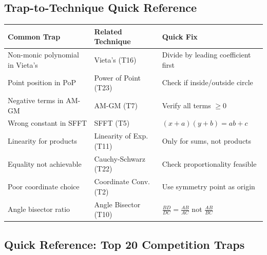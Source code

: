 \documentclass{article}
\begin{document}
\subsection{Trap-to-Technique Quick Reference}

\begin{center}
\begin{tabular}{|p{4cm}|p{3cm}|p{5cm}|}
\hline
\textbf{Common Trap} & \textbf{Related Technique} & \textbf{Quick Fix} \\
\hline
Non-monic polynomial in Vieta's & Vieta's (T16) & Divide by leading coefficient first \\
\hline
Point position in PoP & Power of Point (T23) & Check if inside/outside circle \\
\hline
Negative terms in AM-GM & AM-GM (T7) & Verify all terms $\geq 0$ \\
\hline
Wrong constant in SFFT & SFFT (T5) & $(x+a)(y+b) = ab + c$ \\
\hline
Linearity for products & Linearity of Exp. (T11) & Only for sums, not products \\
\hline
Equality not achievable & Cauchy-Schwarz (T22) & Check proportionality feasible \\
\hline
Poor coordinate choice & Coordinate Conv. (T2) & Use symmetry point as origin \\
\hline
Angle bisector ratio & Angle Bisector (T10) & $\frac{BD}{DC} = \frac{AB}{AC}$ not $\frac{AB}{BC}$ \\
\hline
\end{tabular}
\end{center}

\subsection{Quick Reference: Top 20 Competition Traps}
\end{document}
